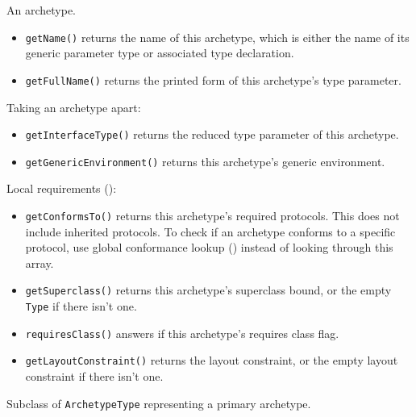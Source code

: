 \documentclass[../generics]{subfiles}
\begin{document}
An archetype.
\begin{itemize}
\item \texttt{getName()} returns the name of this archetype, which is either the name of its generic parameter type or associated type declaration.
\item \texttt{getFullName()} returns the printed form of this archetype's type parameter.
\end{itemize}
Taking an archetype apart:
\begin{itemize}
\item \texttt{getInterfaceType()} returns the reduced type parameter of this archetype.
\item \texttt{getGenericEnvironment()} returns this archetype's generic environment.
\end{itemize}
Local requirements ():
\begin{itemize}
\item \texttt{getConformsTo()} returns this archetype's required protocols. This does not include inherited protocols. To check if an archetype conforms to a specific protocol, use global conformance lookup () instead of looking through this array.
\item \texttt{getSuperclass()} returns this archetype's superclass bound, or the empty \texttt{Type} if there isn't one.
\item \texttt{requiresClass()} answers if this archetype's requires class flag.
\item \texttt{getLayoutConstraint()} returns the layout constraint, or the empty layout constraint if there isn't one.
\end{itemize}

Subclass of \texttt{ArchetypeType} representing a primary archetype.
\end{document}
